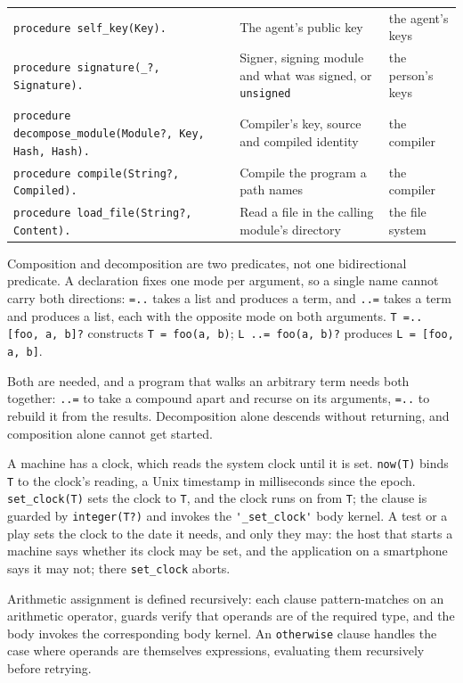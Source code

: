 \begin{center}
{\begin{tabular}{lll}
\verb|procedure self_key(Key).| & The agent's public key & the agent's keys \\
\verb|procedure signature(_?, Signature).| & Signer, signing module and what was signed, or \verb|unsigned| & the person's keys \\
\verb|procedure decompose_module(Module?, Key, Hash, Hash).| & Compiler's key, source and compiled identity & the compiler \\
\verb|procedure compile(String?, Compiled).| & Compile the program a path names & the compiler \\
\verb|procedure load_file(String?, Content).| & Read a file in the calling module's directory & the file system \\
\end{tabular}
}
\end{center}

Composition and decomposition are two predicates, not one bidirectional predicate. A declaration fixes one mode per argument, so a single name cannot carry both directions: \verb|=..| takes a list and produces a term, and \verb|..=| takes a term and produces a list, each with the opposite mode on both arguments. \verb|T =.. [foo, a, b]?| constructs \verb|T = foo(a, b)|; \verb|L ..= foo(a, b)?| produces \verb|L = [foo, a, b]|.

Both are needed, and a program that walks an arbitrary term needs both together: \verb|..=| to take a compound apart and recurse on its arguments, \verb|=..| to rebuild it from the results. Decomposition alone descends without returning, and composition alone cannot get started.

A machine has a clock, which reads the system clock until it is set. \verb|now(T)| binds \verb|T| to the clock's reading, a Unix timestamp in milliseconds since the epoch. \verb|set_clock(T)| sets the clock to \verb|T|, and the clock runs on from \verb|T|; the clause is guarded by \verb|integer(T?)| and invokes the \verb|'_set_clock'| body kernel. A test or a play sets the clock to the date it needs, and only they may: the host that starts a machine says whether its clock may be set, and the application on a smartphone says it may not; there \verb|set_clock| aborts.

Arithmetic assignment is defined recursively: each clause pattern-matches on an arithmetic operator, guards verify that operands are of the required type, and the body invokes the corresponding body kernel. An \verb|otherwise| clause handles the case where operands are themselves expressions, evaluating them recursively before retrying.

